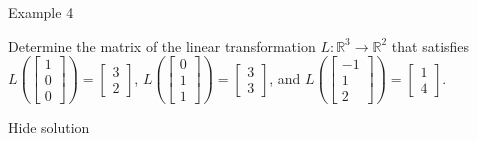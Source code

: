 Example 4

Determine the matrix of the linear transformation \( L:\mathbb R^3\to\mathbb R^2 \) that satisfies \( L\left(\left[\begin{array}{c}1\\0\\0\end{array}\right]\right)=\left[\begin{array}{c} 3\\2\end{array}\right]\), \( L\left(\left[\begin{array}{c}0\\1\\1\end{array}\right]\right)=\left[\begin{array}{c} 3\\3\end{array}\right]\), and \( L\left(\left[\begin{array}{c}-1\\1\\2\end{array}\right]\right)=\left[\begin{array}{c}1\\4\end{array}\right]\).

Hide solution

